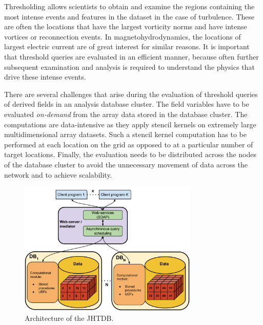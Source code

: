 \documentclass{sig-alternate}
\begin{document}
Thresholding allows scientists to obtain and examine the regions containing the most intense events and features in the dataset in the case of turbulence. 
These are often the locations that have the largest vorticity norms and have intense vortices or reconnection events. 
In magnetohydrodynamics, the locations of largest electric current are of great interest for similar reasons.
It is important that threshold queries are evaluated in an efficient manner, because often further subsequent examination
and analysis is required to understand the physics that drive these intense events. 

There are several challenges that arise during the evaluation of threshold queries of derived fields in an analysis database cluster. The field variables have to be
evaluated \emph{on-demand} from the array data stored in the database cluster. The computations are data-intensive as they apply stencil kernels on extremely
large multidimensional array datasets. Such a stencil kernel computation has to be performed at each location on the grid as opposed to at a particular number 
of target locations. Finally, the evaluation needs to be distributed across the nodes of the database cluster to avoid the unnecessary movement of data across 
the network and to achieve scalability.

\begin{figure}
\centering
\includegraphics[width=3.35in]{Figures/jhtdb_diagram.pdf}
\caption{Architecture of the JHTDB.}
\label{fig:jhtdb_diagram}
\end{figure}
\end{document}
